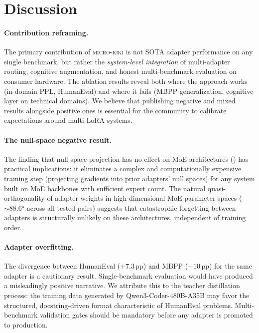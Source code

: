 \documentclass[11pt,a4paper]{article}
\begin{document}
\section{Discussion}
\label{sec:discussion}

\paragraph{Contribution reframing.}
The primary contribution of \textsc{micro-kiki} is not SOTA adapter performance on any single benchmark, but rather the \emph{system-level integration} of multi-adapter routing, cognitive augmentation, and honest multi-benchmark evaluation on consumer hardware. The ablation results reveal both where the approach works (in-domain PPL, HumanEval) and where it fails (MBPP generalization, cognitive layer on technical domains). We believe that publishing negative and mixed results alongside positive ones is essential for the community to calibrate expectations around multi-LoRA systems.

\paragraph{The null-space negative result.}
The finding that null-space projection has no effect on MoE architectures () has practical implications: it eliminates a complex and computationally expensive training step (projecting gradients into prior adapters' null spaces) for any system built on MoE backbones with sufficient expert count. The natural quasi-orthogonality of adapter weights in high-dimensional MoE parameter spaces (${\sim}88.6$° across all tested pairs) suggests that catastrophic forgetting between adapters is structurally unlikely on these architectures, independent of training order.

\paragraph{Adapter overfitting.}
The divergence between HumanEval ($+7.3$\,pp) and MBPP ($-10$\,pp) for the same adapter is a cautionary result. Single-benchmark evaluation would have produced a misleadingly positive narrative. We attribute this to the teacher distillation process: the training data generated by Qwen3-Coder-480B-A35B may favor the structured, docstring-driven format characteristic of HumanEval problems. Multi-benchmark validation gates should be mandatory before any adapter is promoted to production.
\end{document}
